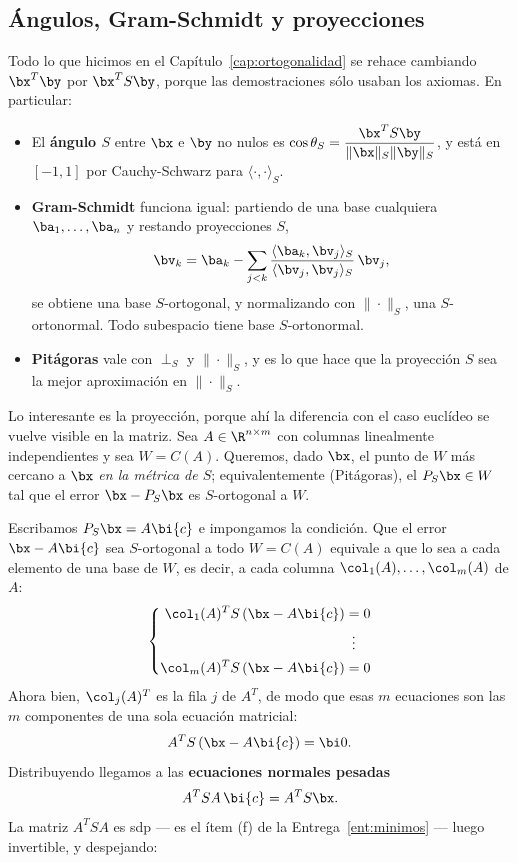 \subsection{Ángulos, Gram-Schmidt y proyecciones}

Todo lo que hicimos en el Capítulo~\ref{cap:ortogonalidad} se rehace
cambiando $\bx^T\by$ por $\bx^TS\by$, porque las demostraciones sólo usaban
los axiomas. En particular:

\begin{itemize}[itemsep=3pt]
\item El \textbf{ángulo $S$} entre $\bx$ e $\by$ no nulos es
$\cos\theta_S=\dfrac{\bx^TS\by}{\|\bx\|_S\|\by\|_S}$, y está en $[-1,1]$ por
Cauchy-Schwarz para $\langle\cdot,\cdot\rangle_S$.

\item \textbf{Gram-Schmidt} funciona igual: partiendo de una base cualquiera
$\ba_1,\dots,\ba_n$ y restando proyecciones $S$,
\[
\bv_k=\ba_k-\sum_{j<k}\frac{\langle \ba_k,\bv_j\rangle_S}{\langle \bv_j,\bv_j\rangle_S}\,\bv_j ,
\]
se obtiene una base $S$-ortogonal, y normalizando con $\|\cdot\|_S$, una
$S$-ortonormal. Todo subespacio tiene base $S$-ortonormal.

\item \textbf{Pitágoras} vale con $\perp_S$ y $\|\cdot\|_S$, y es lo que hace
que la proyección $S$ sea la mejor aproximación en $\|\cdot\|_S$.
\end{itemize}

Lo interesante es la proyección, porque ahí la diferencia con el caso
euclídeo se vuelve visible en la matriz. Sea $A\in\R^{n\times m}$ con
columnas linealmente independientes y sea $W=C(A)$. Queremos, dado $\bx$, el
punto de $W$ más cercano a $\bx$ \emph{en la métrica de $S$}; equivalentemente
(Pitágoras), el $P_S\bx\in W$ tal que el error $\bx-P_S\bx$ es
$S$-ortogonal a $W$.

Escribamos $P_S\bx=A\bi{c}$ e impongamos la condición. Que el error
$\bx-A\bi{c}$ sea $S$-ortogonal a todo $W=C(A)$ equivale a que lo sea a cada
elemento de una base de $W$, es decir, a cada columna
$\col_1(A),\dots,\col_m(A)$ de $A$:
\[
\left\{
\begin{aligned}
\col_1(A)^T S\,(\bx-A\bi{c}) &= 0 \\
&\ \,\vdots \\
\col_m(A)^T S\,(\bx-A\bi{c}) &= 0
\end{aligned}
\right.
\]
Ahora bien, $\col_j(A)^T$ es la fila $j$ de $A^T$, de modo que esas $m$
ecuaciones son las $m$ componentes de una sola ecuación matricial:
\[
A^T S\,(\bx-A\bi{c}) = \bi 0 .
\]
Distribuyendo llegamos a las \textbf{ecuaciones normales pesadas}
\begin{equation}\label{eq:normales-pesadas}
A^TSA\,\bi{c}=A^TS\bx .
\end{equation}
La matriz $A^TSA$ es sdp --- es el ítem (f) de la
Entrega~\ref{ent:minimos} --- luego invertible, y despejando:

